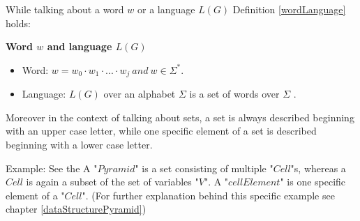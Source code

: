 While talking about a word $w$ or a language $L(G)$ Definition \ref{wordLanguage} holds:
\begin{DefGrey}\label{wordLanguage} \textbf{Word $w$ and language $L(G)$}
	\begin{itemize}
		\item Word: $w = w_0\cdot w_1\cdot ...\cdot w_j~and~w \in \Sigma^*$.
		\item Language: $L(G)$ over an alphabet $\Sigma$ is a set of words over $\Sigma$ .
	\end{itemize}
\end{DefGrey}
\noindent Moreover in the context of talking about sets, a set is always described beginning with an upper case letter, while one specific element of a set is described beginning with a lower case letter. 
\begin{testexample}
	Example: See the A "$Pyramid$" is a set consisting of multiple "$Cell$"s, whereas a $Cell$ is again a subset of the set of variables "$V$". A "$cellElement$" is one specific element of a "$Cell$". (For further explanation behind this specific example see chapter \ref{dataStructurePyramid})
\end{testexample}



 
